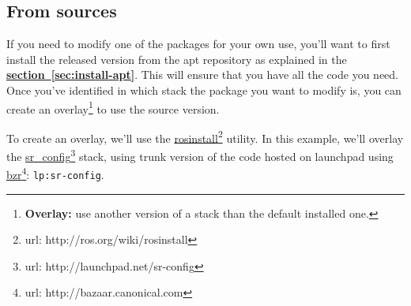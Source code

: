 \documentclass[12pt]{article}
\newcommand{\link}[1]{\hyperref[sec:#1]{\textbf{section~\ref*{sec:#1}}}}
\newcommand{\betterhref}[2]{\href{#1}{#2}\footnote{url: #1}}
\begin{document}
\subsection{From sources}
\label{sec:install-src}
\par If you need to modify one of the packages for your own use, you'll want to first install the released version from the apt repository as explained in the \link{install-apt}. This will ensure that you have all the code you need. Once you've identified in which stack the package you want to modify is, you can create an overlay\footnote{\textbf{Overlay:} use another version of a stack than the default installed one.} to use the source version.\\

\par To create an overlay, we'll use the \betterhref{http://ros.org/wiki/rosinstall}{rosinstall} utility. In this example, we'll overlay the \betterhref{http://launchpad.net/sr-config}{sr\_config} stack, using trunk version of the code hosted on launchpad using \betterhref{http://bazaar.canonical.com}{bzr}: \texttt{lp:sr-config}.
\end{document}
